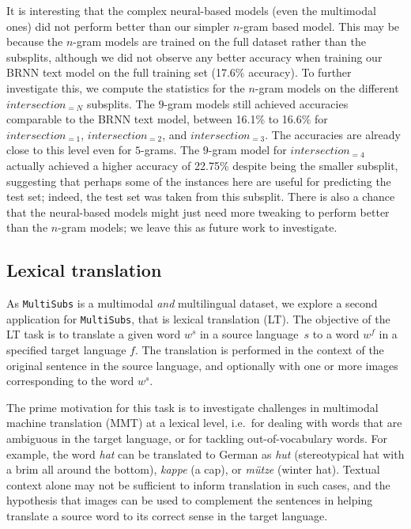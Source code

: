 \documentclass[twocolumn]{svjour3}          \smartqed  \usepackage{graphicx}
\newcommand{\multisubs}{\texttt{MultiSubs}\xspace}
\begin{document}
It is interesting that the complex neural-based models (even the multimodal ones) did not perform better than our simpler $n$-gram based model. This may be because the $n$-gram models are trained on the full dataset rather than the subsplits, although we did not observe any better accuracy when training our BRNN text model on the full training set (17.6\% accuracy). To further investigate this, we compute the statistics for the $n$-gram models on the different $intersection_{=N}$ subsplits. The $9$-gram models still achieved accuracies comparable to the BRNN text model, between 16.1\% to 16.6\% for $intersection_{=1}$, $intersection_{=2}$, and $intersection_{=3}$. The accuracies are already close to this level even for $5$-grams. The $9$-gram model for $intersection_{=4}$ actually achieved a higher accuracy of 22.75\% despite being the smaller subsplit, suggesting that perhaps some of the instances here are useful for predicting the test set; indeed, the test set was taken from this subsplit. There is also a chance that the neural-based models might just need more tweaking to perform better than the $n$-gram models; we leave this as future work to investigate.

\subsection{Lexical translation}
\label{sec:mlt}

As \multisubs is a multimodal \emph{and} multilingual dataset, we explore a second application for \multisubs, that is lexical translation (LT). The objective of the LT task is to translate a given word $w^s$ in a source language~$s$ to a word $w^f$ in a specified target language $f$. The translation is performed in the context of the original sentence in the source language, and optionally with one or more images corresponding to the word $w^s$. 

The prime motivation for this task is to investigate challenges in multimodal machine translation (MMT) at a lexical level, i.e.\ for dealing with words that are ambiguous in the target language, or for tackling out-of-vocabulary words. For example, the word \textit{hat} can be translated to German as \textit{hut} (stereotypical hat with a brim all around the bottom), \textit{kappe} (a cap), or \textit{m{\"u}tze} (winter hat). Textual context alone may not be sufficient to inform translation in such cases, and the hypothesis that images can be used to complement the sentences in helping translate a source word to its correct sense in the target language.
\end{document}
